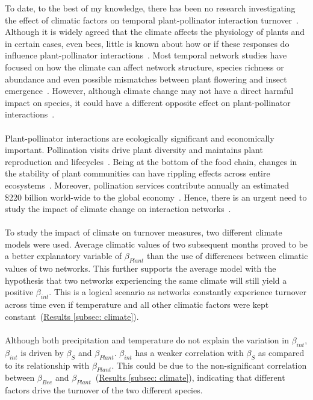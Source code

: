 \documentclass[11pt]{article}
\begin{document}
To date, to the best of my knowledge, there has been no research investigating the effect of climatic factors on temporal plant-pollinator interaction turnover~\citep{Burkle2011, Scaven2013}. Although it is widely agreed that the climate affects the physiology of plants and in certain cases, even bees, little is known about how or if these responses do influence plant-pollinator interactions~\citep{Hughes2000, Parmesan2003}. Most temporal network studies have focused on how the climate can affect network structure, species richness or abundance and even possible mismatches between plant flowering and insect emergence~\citep{BASILIO2006, Alarcon2008, MartinGonzalez2009, Schweiger2010}. However, although climate change may not have a direct harmful impact on species, it could have a different opposite effect on plant-pollinator interactions~\citep{Hegland2009, Scaven2013}. \\
\\
Plant-pollinator interactions are ecologically significant and economically important. Pollination visits drive plant diversity and maintains plant reproduction and lifecycles~\citep{Olesen2008}. Being at the bottom of the food chain, changes in the stability of plant communities can have rippling effects across entire ecosystems~\citep{Scaven2013}. Moreover, pollination services contribute annually an estimated \$220 billion world-wide to the global economy~\citep{Gallai2009}. Hence, there is an urgent need to study the impact of climate change on interaction networks~\citep{Scaven2013}. \\
\\
To study the impact of climate on turnover measures, two different climate models were used. Average climatic values of two subsequent months proved to be a better explanatory variable of $\beta_{Plant}$ than the use of differences between climatic values of two networks. This further supports the average model with the hypothesis that two networks experiencing the same climate will still yield a positive $\beta_{int}$. This is a logical scenario as networks constantly experience turnover across time even if temperature and all other climatic factors were kept constant~(\hyperref[subsec: climate]{Results \ref{subsec: climate}}).\\
\\
Although both precipitation and temperature do not explain the variation in $\beta_{int}$, $\beta_{int}$ is driven by $\beta_{S}$ and $\beta_{Plant}$. $\beta_{int}$ has a weaker correlation with $\beta_{S}$ as compared to its relationship with $\beta_{Plant}$. This could be due to the non-significant correlation between $\beta_{Bee}$ and $\beta_{Plant}$~(\hyperref[subsec: climate]{Results \ref{subsec: climate}}), indicating that different factors drive the turnover of the two different species. \\
\end{document}
